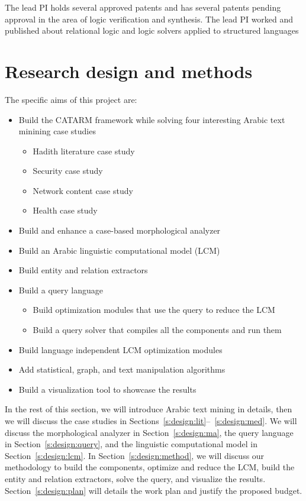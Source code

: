 \documentclass[12pt]{article}
\begin{document}
The lead PI holds several approved patents and has several 
patents pending approval in the area of logic verification 
and synthesis.
The lead PI worked and published about relational logic and 
logic solvers applied to structured languages~\cite{seraICSE07,Zara05}

\section{Research design and methods}
\label{s:designmethods}

The specific aims of this project are:
\begin{itemize}
\item Build the CATARM framework while solving four interesting Arabic 
text minining case studies
  \begin{itemize}
  \item Hadith literature case study
  \item Security case study
  \item Network content case study
  \item Health case study
  \end{itemize}
\item Build and enhance a case-based morphological analyzer
\item Build an Arabic linguistic computational model (LCM)
\item Build entity and relation extractors
\item Build a query language 
  \begin{itemize}
  \item Build optimization modules that use the query to reduce the LCM
  \item Build a query solver that compiles all the components and run them 
  \end{itemize}
\item Build language independent LCM optimization modules
\item Add statistical, graph, and text manipulation algorithms
\item Build a visualization tool to showcase the results 
\end{itemize}

In the rest of this section, we will introduce Arabic text mining in 
details, then we will discuss the case studies in 
Sections~\ref{s:design:lit}--~\ref{s:design:med}. 
We will discuss the morphological analyzer in Section~\ref{s:design:ma}, 
the query language in Section~\ref{s:design:query}, and the linguistic
computational model in Section~\ref{s:design:lcm}.
In Section~\ref{s:design:method}, we will discuss our methodology
to build the components, optimize and reduce the LCM, build the
entity and relation extractors, solve the query, and visualize the 
results. 
Section~\ref{s:design:plan} will details the work plan and
justify the proposed budget.
\end{document}
